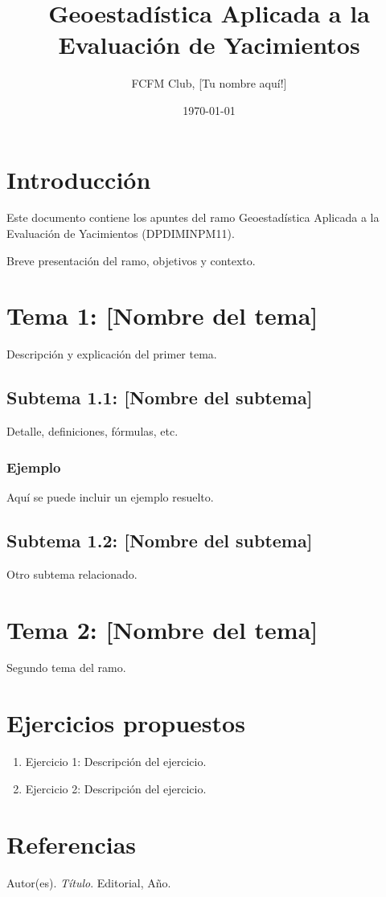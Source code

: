 \documentclass[12pt]{article}
\title{Geoestadística Aplicada a la Evaluación de Yacimientos}
\author{FCFM Club, [Tu nombre aquí!]}
\date{\today}
\begin{document}
\maketitle
\tableofcontents
\newpage

\section{Introducción}
Este documento contiene los apuntes del ramo Geoestadística Aplicada a la Evaluación de Yacimientos (DPDIMINPM11).

Breve presentación del ramo, objetivos y contexto.

\section{Tema 1: [Nombre del tema]}
Descripción y explicación del primer tema.

\subsection{Subtema 1.1: [Nombre del subtema]}
Detalle, definiciones, fórmulas, etc.

\subsubsection{Ejemplo}
Aquí se puede incluir un ejemplo resuelto.

\subsection{Subtema 1.2: [Nombre del subtema]}
Otro subtema relacionado.

\section{Tema 2: [Nombre del tema]}
Segundo tema del ramo.


\section{Ejercicios propuestos}
\begin{enumerate}
    \item Ejercicio 1: Descripción del ejercicio.
    \item Ejercicio 2: Descripción del ejercicio.
\end{enumerate}

\section{Referencias}
\begin{thebibliography}{9}
     Autor(es). \textit{Título}. Editorial, Año.
\end{thebibliography}
\end{document}
